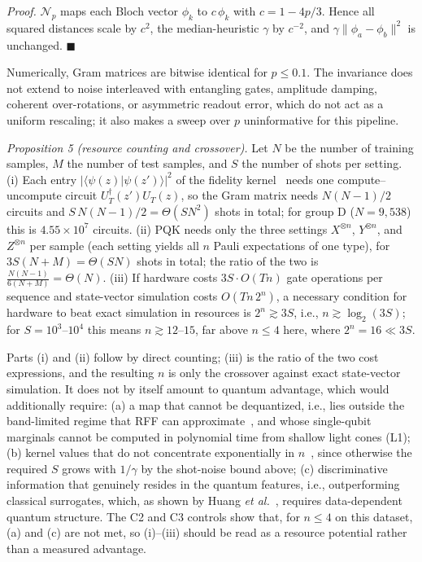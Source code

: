 \documentclass[conference]{IEEEtran}
\begin{document}
\textit{Proof.} $\mathcal{N}_p$ maps each Bloch vector $\phi_k$ to $c\,\phi_k$ with $c=1-4p/3$. Hence all squared distances scale by $c^2$, the median-heuristic $\gamma$ by $c^{-2}$, and $\gamma\|\phi_a-\phi_b\|^2$ is unchanged. $\blacksquare$

Numerically, Gram matrices are bitwise identical for $p\le0.1$. The invariance does not extend to noise interleaved with entangling gates, amplitude damping, coherent over-rotations, or asymmetric readout error, which do not act as a uniform rescaling; it also makes a sweep over $p$ uninformative for this pipeline.

\textit{Proposition 5 (resource counting and crossover).} Let $N$ be the number of training samples, $M$ the number of test samples, and $S$ the number of shots per setting. (i) Each entry $|\langle\psi(z)|\psi(z')\rangle|^2$ of the fidelity kernel~\cite{havlicek2019} needs one compute--uncompute circuit $U_T^{\dagger}(z')U_T(z)$, so the Gram matrix needs $N(N-1)/2$ circuits and $S\,N(N-1)/2=\Theta(SN^2)$ shots in total; for group D ($N=9{,}538$) this is $4.55\times10^7$ circuits. (ii) PQK needs only the three settings $X^{\otimes n}$, $Y^{\otimes n}$, and $Z^{\otimes n}$ per sample (each setting yields all $n$ Pauli expectations of one type), for $3S(N+M)=\Theta(SN)$ shots in total; the ratio of the two is $\frac{N(N-1)}{6(N+M)}=\Theta(N)$. (iii) If hardware costs $3S\cdot O(Tn)$ gate operations per sequence and state-vector simulation costs $O(Tn\,2^{n})$, a necessary condition for hardware to beat exact simulation in resources is $2^{n}\gtrsim 3S$, i.e., $n\gtrsim\log_2(3S)$; for $S=10^{3}$--$10^{4}$ this means $n\gtrsim12$--$15$, far above $n\le4$ here, where $2^n=16\ll3S$.

Parts (i) and (ii) follow by direct counting; (iii) is the ratio of the two cost expressions, and the resulting $n$ is only the crossover against exact state-vector simulation. It does not by itself amount to quantum advantage, which would additionally require: (a) a map that cannot be dequantized, i.e., lies outside the band-limited regime that RFF can approximate~\cite{schreiber2023surrogates,sweke2023rff}, and whose single-qubit marginals cannot be computed in polynomial time from shallow light cones (L1); (b) kernel values that do not concentrate exponentially in $n$~\cite{thanasilp2024concentration}, since otherwise the required $S$ grows with $1/\gamma$ by the shot-noise bound above; (c) discriminative information that genuinely resides in the quantum features, i.e., outperforming classical surrogates, which, as shown by Huang \textit{et al.}~\cite{huang2021power}, requires data-dependent quantum structure. The C2 and C3 controls show that, for $n\le4$ on this dataset, (a) and (c) are not met, so (i)--(iii) should be read as a resource potential rather than a measured advantage.
\end{document}
